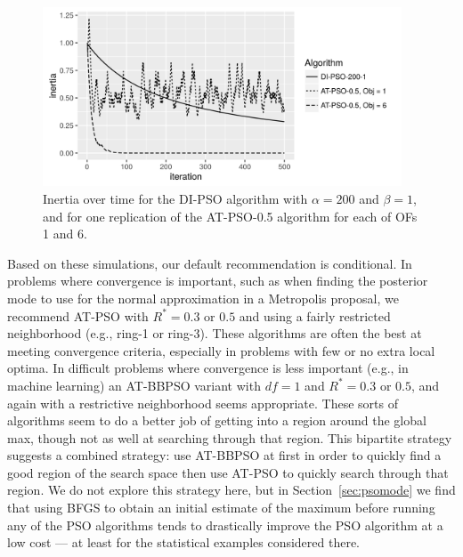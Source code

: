 \documentclass[12pt]{article}
\begin{document}
\begin{figure}[!ht]
\centering
\includegraphics[width=0.95\textwidth]{psosims/inertiaplot.png}
\caption{Inertia over time for the DI-PSO algorithm with $\alpha=200$ and $\beta=1$, and for one replication of the AT-PSO-0.5 algorithm for each of OFs 1 and 6.}
\label{fig:inertia}
\end{figure}


Based on these simulations, our default recommendation is conditional. In problems where convergence is important, such as when finding the posterior mode to use for the normal approximation in a Metropolis proposal, we recommend AT-PSO with $R^*=0.3$ or $0.5$ and using a fairly restricted neighborhood (e.g., ring-1 or ring-3). These algorithms are often the best at meeting convergence criteria, especially in problems with few or no extra local optima. In difficult problems where convergence is less important (e.g., in machine learning) an AT-BBPSO variant with $df=1$ and $R^*=0.3$ or $0.5$, and again with a restrictive neighborhood seems appropriate. These sorts of algorithms seem to do a better job of getting into a region around the global max, though not as well at searching through that region. This bipartite strategy suggests a combined strategy: use AT-BBPSO at first in order to quickly find a good region of the search space then use AT-PSO to quickly search through that region. We do not explore this strategy here, but in Section~\ref{sec:psomode} we find that using BFGS to obtain an initial estimate of the maximum before running any of the PSO algorithms tends to drastically improve the PSO algorithm at a low cost --- at least for the statistical examples considered there.
\end{document}
